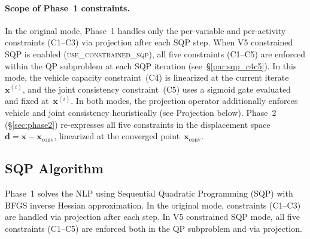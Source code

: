 \documentclass[11pt,a4paper]{article}
\newcommand{\xconv}{\mathbf{x}_{\mathrm{conv}}}
\begin{document}
\paragraph{Scope of Phase~1 constraints.}
In the original mode, Phase~1 handles only the per-variable and per-activity constraints (C1--C3) via projection after each SQP step.
When V5 constrained SQP is enabled (\textsc{use\_constrained\_sqp}), all five constraints (C1--C5) are enforced within the QP subproblem at each SQP iteration (see~\S\ref{par:sqp_c4c5}).
In this mode, the vehicle capacity constraint~(C4) is linearized at the current iterate~$\mathbf{x}^{(i)}$, and the joint consistency constraint~(C5) uses a sigmoid gate evaluated and fixed at~$\mathbf{x}^{(i)}$.
In both modes, the projection operator additionally enforces vehicle and joint consistency heuristically (see Projection below).
Phase~2 (\S\ref{sec:phase2}) re-expresses all five constraints in the displacement space $\mathbf{d} = \mathbf{x} - \xconv$, linearized at the converged point~$\xconv$.

\subsection{SQP Algorithm}

Phase~1 solves the NLP using Sequential Quadratic Programming (SQP) with BFGS inverse Hessian approximation. In the original mode, constraints (C1--C3) are handled via projection after each step. In V5 constrained SQP mode, all five constraints (C1--C5) are enforced both in the QP subproblem and via projection.
\end{document}
